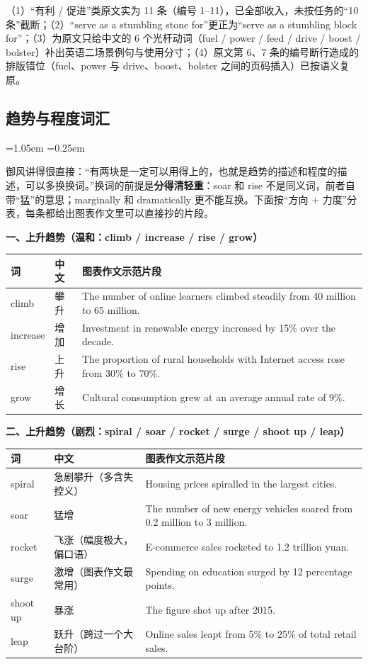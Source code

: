 \documentclass[11pt,a4paper]{ctexart}
\newcommand{\impr}[1]{\par\addvspace{3pt}\noindent{\bfseries【本次改进】}#1\par\addvspace{3pt}}
\newenvironment{note}{%
  \par\addvspace{5pt}%
  \begin{list}{}{\leftmargin=1.05em \rightmargin=0.25em \listparindent=0pt
    \itemindent=0pt \topsep=0pt \parsep=2pt \itemsep=2pt \partopsep=0pt}%
  \item\relax\small\color{ink}%
}{%
  \end{list}\addvspace{5pt}%
}
\begin{document}
\impr{（1）“有利 / 促进”类原文实为 11 条（编号 1--11），已全部收入，未按任务的“10 条”截断；（2）“serve as a stumbling stone for”更正为“serve as a stumbling block for”；（3）为原文只给中文的 6 个光杆动词（fuel / power / feed / drive / boost / bolster）补出英语二场景例句与使用分寸；（4）原文第 6、7 条的编号断行造成的排版错位（fuel、power 与 drive、boost、bolster 之间的页码插入）已按语义复原。}

\subsection{趋势与程度词汇}

\begin{note}
御风讲得很直接：“有两块是一定可以用得上的，也就是趋势的描述和程度的描述，可以多换换词。”换词的前提是\textbf{分得清轻重}：soar 和 rise 不是同义词，前者自带“猛”的意思；marginally 和 dramatically 更不能互换。下面按“方向 + 力度”分表，每条都给出图表作文里可以直接抄的片段。
\end{note}

\par\addvspace{5pt}\noindent\textbf{一、上升趋势（温和：climb / increase / rise / grow）}\par\addvspace{2pt}
\begin{longtable}{L{2.9cm}L{1.9cm}L{10.9cm}}
\toprule
\textbf{词} & \textbf{中文} & \textbf{图表作文示范片段} \\
\midrule
\endhead
climb & 攀升 & The number of online learners climbed steadily from 40 million to 65 million. \\
increase & 增加 & Investment in renewable energy increased by 15\% over the decade. \\
rise & 上升 & The proportion of rural households with Internet access rose from 30\% to 70\%. \\
grow & 增长 & Cultural consumption grew at an average annual rate of 9\%. \\
\bottomrule
\end{longtable}

\par\addvspace{5pt}\noindent\textbf{二、上升趋势（剧烈：spiral / soar / rocket / surge / shoot up / leap）}\par\addvspace{2pt}
\begin{longtable}{L{2.9cm}L{1.9cm}L{10.9cm}}
\toprule
\textbf{词} & \textbf{中文} & \textbf{图表作文示范片段} \\
\midrule
\endhead
spiral & 急剧攀升（多含失控义） & Housing prices spiralled in the largest cities. \\
soar & 猛增 & The number of new energy vehicles soared from 0.2 million to 3 million. \\
rocket & 飞涨（幅度极大，偏口语） & E-commerce sales rocketed to 1.2 trillion yuan. \\
surge & 激增（图表作文最常用） & Spending on education surged by 12 percentage points. \\
shoot up & 暴涨 & The figure shot up after 2015. \\
leap & 跃升（跨过一个大台阶） & Online sales leapt from 5\% to 25\% of total retail sales. \\
\bottomrule
\end{longtable}
\end{document}
